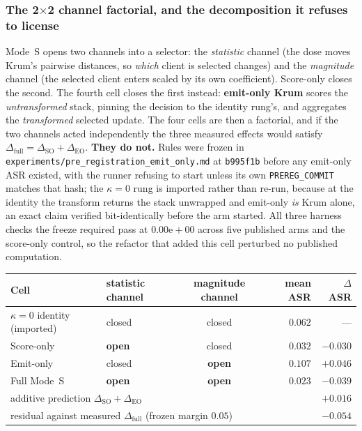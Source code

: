 \documentclass{article}
\begin{document}
\subsubsection{The 2$\times$2 channel factorial, and the decomposition it refuses to license}
\label{app:factorial}
Mode~S opens two channels into a selector: the \emph{statistic} channel (the dose moves Krum's pairwise distances, so \emph{which} client is selected changes) and the \emph{magnitude} channel (the selected client enters scaled by its own coefficient). Score-only closes the second. The fourth cell closes the first instead: \textbf{emit-only Krum} scores the \emph{untransformed} stack, pinning the decision to the identity rung's, and aggregates the \emph{transformed} selected update. The four cells are then a factorial, and if the two channels acted independently the three measured effects would satisfy $\Delta_{\mathrm{full}} = \Delta_{\mathrm{SO}} + \Delta_{\mathrm{EO}}$. \textbf{They do not.} Rules were frozen in \texttt{experiments/\allowbreak pre\_registration\_emit\_only.md} at \texttt{b995f1b} before any emit-only ASR existed, with the runner refusing to start unless its own \texttt{PREREG\_COMMIT} matches that hash; the $\kappa{=}0$ rung is imported rather than re-run, because at the identity the transform returns the stack unwrapped and emit-only \emph{is} Krum alone, an exact claim verified bit-identically before the arm started. All three harness checks the freeze required pass at $0.00\mathrm{e}{+}00$ across five published arms and the score-only control, so the refactor that added this cell perturbed no published computation.

\begin{center}\small\setlength{\tabcolsep}{5pt}
\begin{tabular}{llcrr}
\toprule
Cell & statistic channel & magnitude channel & mean ASR & $\Delta$ASR \\
\midrule
$\kappa{=}0$ identity (imported) & closed & closed & $0.062$ & --- \\
Score-only & \textbf{open} & closed & $0.032$ & $-0.030$ \\
Emit-only & closed & \textbf{open} & $0.107$ & $+0.046$ \\
Full Mode~S & \textbf{open} & \textbf{open} & $0.023$ & $-0.039$ \\
\midrule
\multicolumn{4}{l}{additive prediction $\Delta_{\mathrm{SO}}+\Delta_{\mathrm{EO}}$} & $+0.016$ \\
\multicolumn{4}{l}{residual against measured $\Delta_{\mathrm{full}}$ (frozen margin $0.05$)} & $\mathbf{-0.054}$ \\
\bottomrule
\end{tabular}
\end{center}
\end{document}
